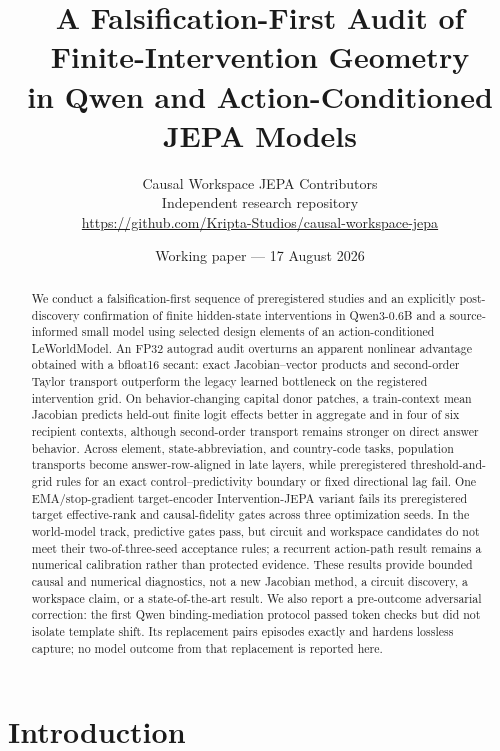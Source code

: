 \documentclass[10pt]{article}
\title{A Falsification-First Audit of Finite-Intervention Geometry\\
in Qwen and Action-Conditioned JEPA Models}
\author{Causal Workspace JEPA Contributors\\
\small Independent research repository\\
\small \url{https://github.com/Kripta-Studios/causal-workspace-jepa}}
\date{Working paper --- 17 August 2026}
\begin{document}
\maketitle

\begin{abstract}
We conduct a falsification-first sequence of preregistered studies and an
explicitly post-discovery confirmation of finite hidden-state
interventions in Qwen3-0.6B and a source-informed small model using selected
design elements of an action-conditioned LeWorldModel.  An FP32 autograd audit overturns an apparent
nonlinear advantage obtained with a bfloat16 secant: exact Jacobian--vector
products and second-order Taylor transport outperform the legacy learned
bottleneck on the registered intervention grid.  On behavior-changing capital
donor patches, a train-context mean Jacobian predicts held-out finite logit
effects better in aggregate and in four of six recipient contexts, although
second-order transport remains stronger on direct answer behavior.  Across
element, state-abbreviation, and country-code tasks, population transports
become answer-row-aligned in late layers, while preregistered threshold-and-grid
rules for an exact control--predictivity boundary or fixed directional lag fail.
One EMA/stop-gradient target-encoder Intervention-JEPA variant fails its
preregistered target effective-rank and causal-fidelity gates across three
optimization seeds.  In the world-model track, predictive gates pass, but
circuit and workspace candidates do not meet their two-of-three-seed acceptance
rules; a recurrent
action-path result remains a numerical calibration rather than protected
evidence.  These results provide bounded causal and numerical diagnostics, not
a new Jacobian method, a circuit discovery, a workspace claim, or a
state-of-the-art result.  We also report a pre-outcome adversarial correction:
the first Qwen binding-mediation protocol passed token checks but did not
isolate template shift.  Its replacement pairs episodes exactly and hardens
lossless capture; no model outcome from that replacement is reported here.
\end{abstract}

\section{Introduction}
\end{document}
